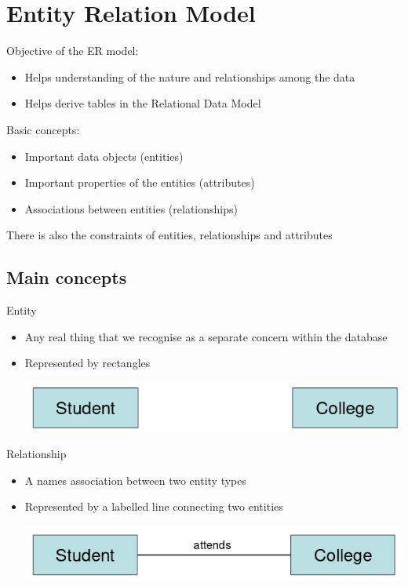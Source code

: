 \documentclass{article}[18pt]
\begin{document}
\section{Entity Relation Model}
Objective of the ER model:
\begin{itemize}
	\item Helps understanding of the nature and relationships among the data
	\item Helps derive tables in the Relational Data Model
\end{itemize}
Basic concepts:
\begin{itemize}
	\item Important data objects (entities)
	\item Important properties of the entities (attributes)
	\item Associations between entities (relationships)
\end{itemize}
There is also the constraints of entities, relationships and attributes
\subsection{Main concepts}
Entity
\begin{itemize}
	\item Any real thing that we recognise as a separate concern within the database
	\item Represented by rectangles
	\begin{center}
		\includegraphics[scale=0.7]{Entity}
	\end{center}
\end{itemize}
Relationship
\begin{itemize}
	\item A names association between two entity types
	\item Represented by a labelled line connecting two entities
	\begin{center}
		\includegraphics[scale=0.7]{Relationship}
	\end{center}
\end{itemize}
\end{document}
